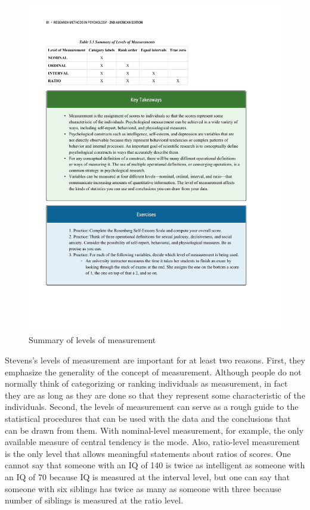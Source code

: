 \begin{figure}

 

      \includegraphics[width=\linewidth]{figures/C5Mscales.pdf}

 

      \caption{Summary of levels of measurement}

 

      \label{fig:scales}
\end{figure}

Stevens's levels of measurement are important for at least two reasons. First, they emphasize the generality of the concept of measurement. Although people do not normally think of categorizing or ranking individuals as measurement, in fact they are as long as they are done so that they represent some characteristic of the individuals. Second, the levels of measurement can serve as a rough guide to the statistical procedures that can be used with the data and the conclusions that can be drawn from them. With nominal-level measurement, for example, the only available measure of central tendency is the mode. Also, ratio-level measurement is the only level that allows meaningful statements about ratios of scores. One cannot say that someone with an IQ of 140 is twice as intelligent as someone with an IQ of 70 because IQ is measured at the interval level, but one can say that someone with six siblings has twice as many as someone with three because number of siblings is measured at the ratio level.
        

